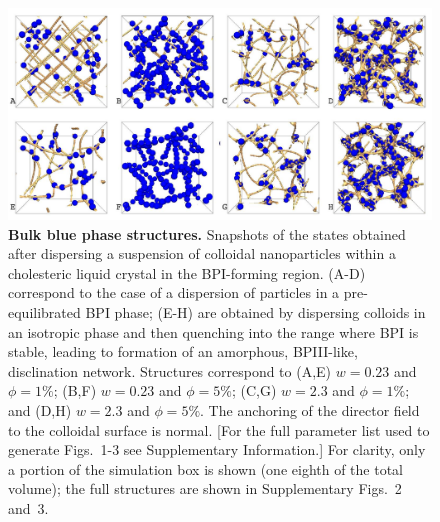 \documentclass[12pt]{article}
\begin{document}
\begin{figure}

\centerline{\includegraphics[width=\textwidth]{text-fig1.jpg}}
\caption{\textbf{Bulk blue phase structures.} Snapshots of the states
obtained after dispersing
a suspension of colloidal nanoparticles within a cholesteric liquid
crystal in the BPI-forming region. (A-D) correspond to the case
of a dispersion of particles in a pre-equilibrated BPI phase;
(E-H) are obtained by dispersing colloids in an isotropic
phase and then quenching into the range where BPI is stable, leading to formation of an amorphous, BPIII-like, disclination network.
Structures correspond
to (A,E) $w=0.23$ and $\phi=1\%$;
(B,F) $w=0.23$ and $\phi=5\%$; 
(C,G) $w=2.3$ and $\phi=1\%$; and
(D,H) $w=2.3$ and $\phi=5\%$.
The anchoring of the director field to the colloidal surface is normal.
[For the full parameter list used to generate Figs.~1-3 see Supplementary
Information.] For clarity, only a portion of the simulation box is shown
(one eighth of the total volume); the full structures are shown in
Supplementary Figs.~2 and~3.}
\end{figure}
\end{document}
